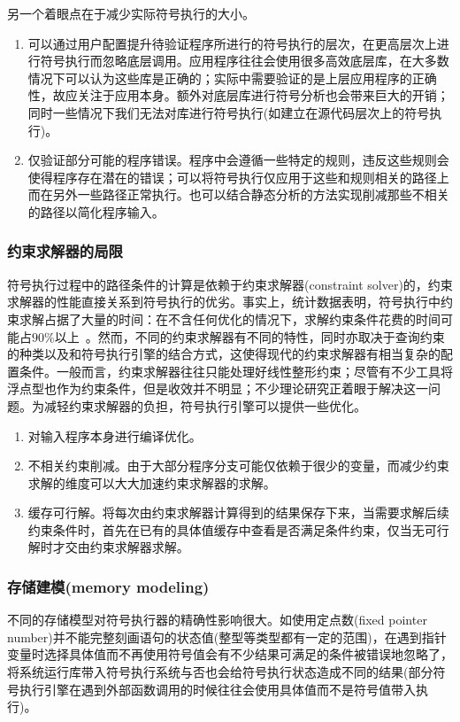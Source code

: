 另一个着眼点在于减少实际符号执行的大小。
\begin{enumerate}
\item 可以通过用户配置提升待验证程序所进行的符号执行的层次，在更高层次上进行符号执行而忽略底层调用。应用程序往往会使用很多高效底层库，在大多数情况下可以认为这些库是正确的；实际中需要验证的是上层应用程序的正确性，故应关注于应用本身。额外对底层库进行符号分析也会带来巨大的开销；同时一些情况下我们无法对库进行符号执行(如建立在源代码层次上的符号执行)。
\item 仅验证部分可能的程序错误。程序中会遵循一些特定的规则，违反这些规则会使得程序存在潜在的错误；可以将符号执行仅应用于这些和规则相关的路径上而在另外一些路径正常执行。也可以结合静态分析的方法实现削减那些不相关的路径以简化程序输入。
\end{enumerate}

\subsubsection{约束求解器的局限}
\label{sec:solver_restrict}

符号执行过程中的路径条件的计算是依赖于约束求解器(constraint solver)的，约束求解器的性能直接关系到符号执行的优劣。事实上，统计数据表明，符号执行中约束求解占据了大量的时间：在不含任何优化的情况下，求解约束条件花费的时间可能占$90\%$以上~。然而，不同的约束求解器有不同的特性，同时亦取决于查询约束的种类以及和符号执行引擎的结合方式，这使得现代的约束求解器有相当复杂的配置条件。一般而言，约束求解器往往只能处理好线性整形约束；尽管有不少工具将浮点型也作为约束条件，但是收效并不明显；不少理论研究正着眼于解决这一问题。为减轻约束求解器的负担，符号执行引擎可以提供一些优化。
\begin{enumerate}
\item 对输入程序本身进行编译优化。
\item 不相关约束削减。由于大部分程序分支可能仅依赖于很少的变量，而减少约束求解的维度可以大大加速约束求解器的求解。
\item 缓存可行解。将每次由约束求解器计算得到的结果保存下来，当需要求解后续约束条件时，首先在已有的具体值缓存中查看是否满足条件约束，仅当无可行解时才交由约束求解器求解。
\end{enumerate}

\subsubsection{存储建模(memory modeling)}
不同的存储模型对符号执行器的精确性影响很大。如使用定点数(fixed pointer number)并不能完整刻画语句的状态值(整型等类型都有一定的范围)，在遇到指针变量时选择具体值而不再使用符号值会有不少结果可满足的条件被错误地忽略了，将系统运行库带入符号执行系统与否也会给符号执行状态造成不同的结果(部分符号执行引擎在遇到外部函数调用的时候往往会使用具体值而不是符号值带入执行)。

